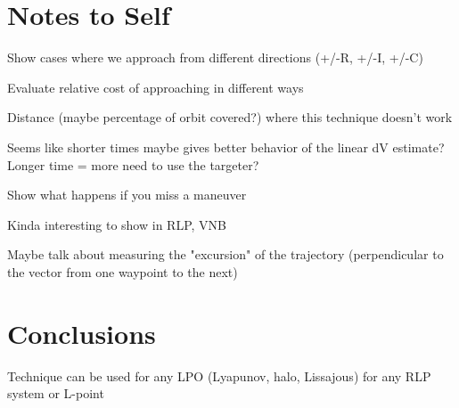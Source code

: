 \documentclass[a4paper]{article}
\begin{document}
\section{Notes to Self}

Show cases where we approach from different directions (+/-R, +/-I, +/-C)

Evaluate relative cost of approaching in different ways

Distance (maybe percentage of orbit covered?) where this technique doesn't work

Seems like shorter times maybe gives better behavior of the linear dV estimate?  Longer time = more need to use the targeter?

Show what happens if you miss a maneuver

Kinda interesting to show in RLP, VNB

Maybe talk about measuring the "excursion" of the trajectory (perpendicular to the vector from one waypoint to the next)

\section{Conclusions}

Technique can be used for any LPO (Lyapunov, halo, Lissajous) for any RLP system or L-point

\begin{thebibliography}{99}
\end{thebibliography}
\end{document}
